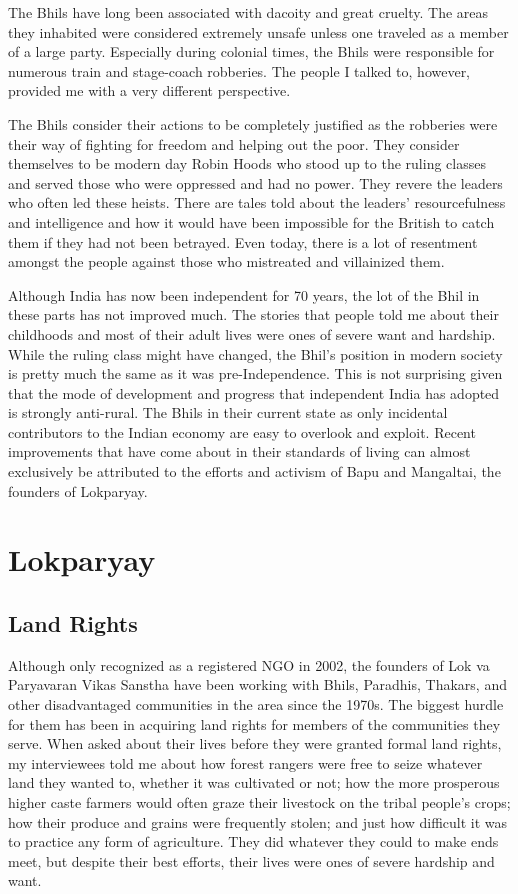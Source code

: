 \documentclass[report.tex]{subfiles}
\begin{document}
The Bhils have long been associated with dacoity and great cruelty. The areas they inhabited were considered extremely unsafe unless one traveled as a member of a large party. Especially during colonial times, the Bhils were responsible for numerous train and stage-coach robberies. The people I talked to, however, provided me with a very different perspective.

The Bhils consider their actions to be completely justified as the robberies were their way of fighting for freedom and helping out the poor. They consider themselves to be modern day Robin Hoods who stood up to the ruling classes and served those who were oppressed and had no power. They revere the leaders who often led these heists. There are tales told about the leaders' resourcefulness and intelligence and how it would have been impossible for the British to catch them if they had not been betrayed. Even today, there is a lot of resentment amongst the people against those who mistreated and villainized them.

Although India has now been independent for 70 years, the lot of the Bhil in these parts has not improved much. The stories that people told me about their childhoods and most of their adult lives were ones of severe want and hardship. While the ruling class might have changed, the Bhil's position in modern society is pretty much the same as it was pre-Independence. This is not surprising given that the mode of development and progress that independent India has adopted is strongly anti-rural. The Bhils in their current state as only incidental contributors to the Indian economy are easy to overlook and exploit. Recent improvements that have come about in their standards of living can almost exclusively be attributed to the efforts and activism of Bapu and Mangaltai, the founders of Lokparyay.

\section{Lokparyay}\label{sec:lokparyay}

\subsection{Land Rights}\label{subsec:rights}
Although only recognized as a registered NGO in 2002, the founders of Lok va Paryavaran Vikas Sanstha have been working with Bhils, Paradhis, Thakars, and other disadvantaged communities in the area since the 1970s. The biggest hurdle for them has been in acquiring land rights for members of the communities they serve. When asked about their lives before they were granted formal land rights, my interviewees told me about how forest rangers were free to seize whatever land they wanted to, whether it was cultivated or not; how the more prosperous higher caste farmers would often graze their livestock on the tribal people's crops; how their produce and grains were frequently stolen; and just how difficult it was to practice any form of agriculture. They did whatever they could to make ends meet, but despite their best efforts, their lives were ones of severe hardship and want.
\end{document}
